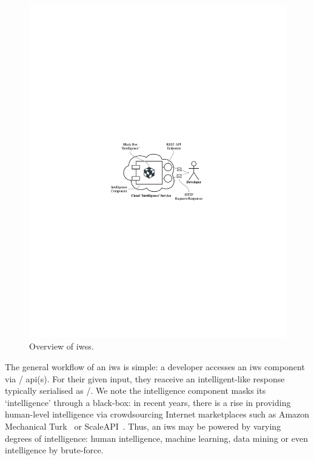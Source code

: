 \begin{figure}[h!]
\centering
\caption[Overview of intelligent web services]{Overview of \glspl{iws}.}
\label{fig:introduction:cloud-intelliegnce-service}
\includegraphics{cloud-intelliegnce-service}
\end{figure}

 
The general workflow of an \gls{iws} is  simple: a developer accesses an \gls{iws} component via / \gls{api}(s). For their given input, they reaceive an intelligent-like response typically serialised as /. We note the intelligence component masks its `intelligence' through a black-box: in recent years, there is a rise in providing human-level intelligence via crowdsourcing Internet marketplaces such as Amazon Mechanical Turk~ or ScaleAPI~. Thus, an \gls{iws} may be powered by varying degrees of intelligence: human intelligence, machine learning, data mining or even intelligence by brute-force.

